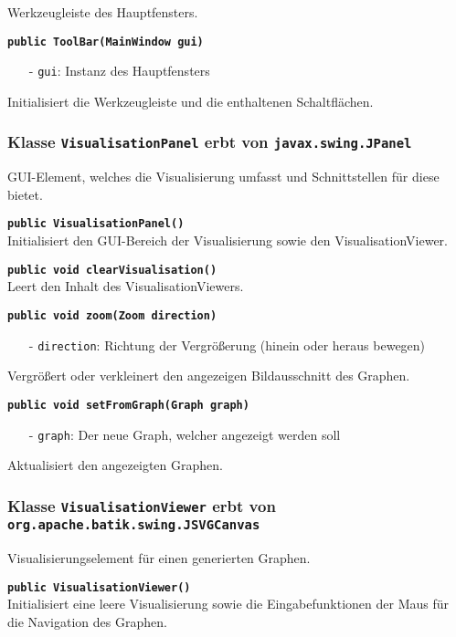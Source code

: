 \documentclass[parskip=full,11pt,twoside]{scrartcl}
\begin{document}
Werkzeugleiste des Hauptfensters.

\textbf{\texttt{public ToolBar(MainWindow gui)}}
\begin{itemize}[noitemsep]
	\item[-] \texttt{gui}: Instanz des Hauptfensters
\end{itemize}
Initialisiert die Werkzeugleiste und die enthaltenen Schaltflächen.

\subsubsection{Klasse \texttt{VisualisationPanel} erbt von \texttt{javax.swing.JPanel}}

GUI-Element, welches die Visualisierung umfasst und Schnittstellen für diese bietet.

\textbf{\texttt{public VisualisationPanel()}}\\
Initialisiert den GUI-Bereich der Visualisierung sowie den VisualisationViewer.

\textbf{\texttt{public void clearVisualisation()}}\\
Leert den Inhalt des VisualisationViewers.

\textbf{\texttt{public void zoom(Zoom direction)}}
\begin{itemize}[noitemsep]
	\item[-] \texttt{direction}: Richtung der Vergrößerung (hinein oder heraus bewegen)
\end{itemize}
Vergrößert oder verkleinert den angezeigen Bildausschnitt des Graphen.

\textbf{\texttt{public void setFromGraph(Graph graph)}}
\begin{itemize}[noitemsep]
	\item[-] \texttt{graph}: Der neue Graph, welcher angezeigt werden soll
\end{itemize}
Aktualisiert den angezeigten Graphen.

\subsubsection{Klasse \texttt{VisualisationViewer} erbt von \texttt{org.apache.batik.swing.JSVGCanvas}}

Visualisierungselement für einen generierten Graphen.

\textbf{\texttt{public VisualisationViewer()}}\\
Initialisiert eine leere Visualisierung sowie die Eingabefunktionen der Maus für die Navigation des Graphen.
\end{document}
